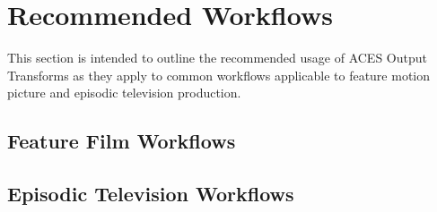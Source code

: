 \numberedformat

\chapter{Recommended Workflows} \label{ch:rec-workflows}
This section is intended to outline the recommended usage of ACES Output Transforms as they apply to common workflows applicable to feature motion picture and episodic television production.

\section{Feature Film Workflows} \label{sec:ff-workflows}
	 \clearpage
	 \clearpage
	 \clearpage
	 \clearpage
	 \clearpage
	 \clearpage
	 \clearpage
	

\section{Episodic Television Workflows} \label{sec:tv-workflows}
	 \clearpage
	 \clearpage
	 \clearpage
	 \clearpage
	 \clearpage
	 \clearpage
	 \clearpage
	

	


